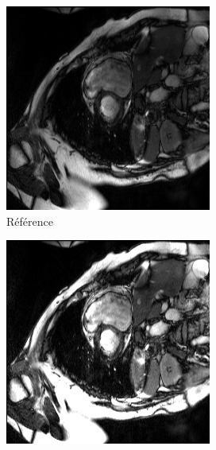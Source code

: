 \documentclass{article}
\begin{document}
\begin{figure}[!h]
     \centering
     \begin{subfigure}[b]{0.19\textwidth}
         \centering
         \includegraphics[width=\textwidth]{figs/modifications/ref.png}
         \caption{Référence}
         \label{fig:ref}
     \end{subfigure}
     \hfill
     \begin{subfigure}[b]{0.19\textwidth}
         \centering
         \includegraphics[width=\textwidth]{figs/modifications/contrast.png}

\end{subfigure}
\end{figure}
\end{document}
